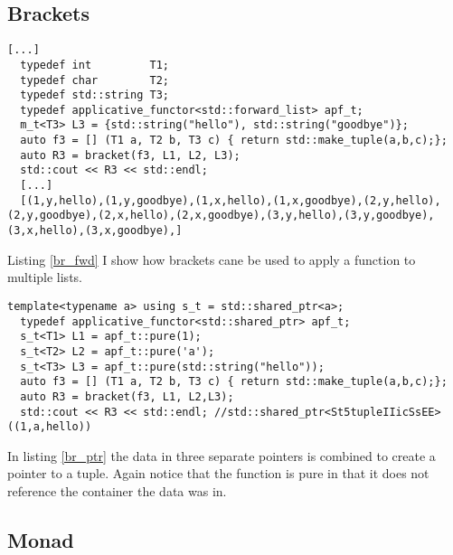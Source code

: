 \documentclass[12pt,fleqn]{article}
\begin{document}
%
%
%
\subsection{Brackets}
%
%
%
%
\begin{minipage}{\linewidth}
\begin{lstlisting}[caption=applicative functor for the std::forward\_list using brackets, label=br_fwd]
[...]
  typedef int         T1;
  typedef char        T2;
  typedef std::string T3;
  typedef applicative_functor<std::forward_list> apf_t;
  m_t<T3> L3 = {std::string("hello"), std::string("goodbye")};
  auto f3 = [] (T1 a, T2 b, T3 c) { return std::make_tuple(a,b,c);};
  auto R3 = bracket(f3, L1, L2, L3);
  std::cout << R3 << std::endl;
  [...]
  [(1,y,hello),(1,y,goodbye),(1,x,hello),(1,x,goodbye),(2,y,hello),(2,y,goodbye),(2,x,hello),(2,x,goodbye),(3,y,hello),(3,y,goodbye),(3,x,hello),(3,x,goodbye),]
\end{lstlisting}
\end{minipage}
%
%
%

Listing \ref{br_fwd} I show how brackets cane be used to apply a function to multiple lists.

%
%
%
\begin{minipage}{\linewidth}
\begin{lstlisting}[caption=applicative functor for shared pointers applied using bracket notation, label=br_ptr]
  template<typename a> using s_t = std::shared_ptr<a>;
  typedef applicative_functor<std::shared_ptr> apf_t;
  s_t<T1> L1 = apf_t::pure(1);
  s_t<T2> L2 = apf_t::pure('a');
  s_t<T3> L3 = apf_t::pure(std::string("hello"));
  auto f3 = [] (T1 a, T2 b, T3 c) { return std::make_tuple(a,b,c);};
  auto R3 = bracket(f3, L1, L2,L3);
  std::cout << R3 << std::endl; //std::shared_ptr<St5tupleIIicSsEE>((1,a,hello))
\end{lstlisting}
\end{minipage}
%
%
%

In listing \ref{br_ptr} the data in three separate pointers is combined to create a pointer to a tuple.
Again notice that the function is pure in that it does not reference the container the data was in.
  
%
%
\subsection{Monad}
%
  
\end{document}
